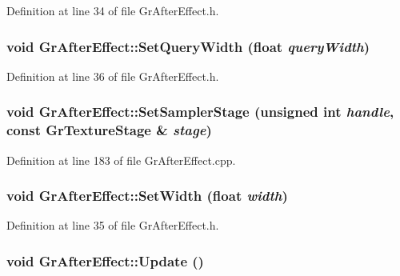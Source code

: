 Definition at line 34 of file GrAfterEffect.h.\hypertarget{class_gr_after_effect_b4c169cb494a24fd5c867bc7132c860b}{
\subsubsection[{SetQueryWidth}]{\setlength{\rightskip}{0pt plus 5cm}void GrAfterEffect::SetQueryWidth (float {\em queryWidth})}}
\label{class_gr_after_effect_b4c169cb494a24fd5c867bc7132c860b}




Definition at line 36 of file GrAfterEffect.h.\hypertarget{class_gr_after_effect_7c18aebb106dd993ad091cd64292d528}{
\subsubsection[{SetSamplerStage}]{\setlength{\rightskip}{0pt plus 5cm}void GrAfterEffect::SetSamplerStage (unsigned int {\em handle}, \/  const {\bf GrTextureStage} \& {\em stage})}}
\label{class_gr_after_effect_7c18aebb106dd993ad091cd64292d528}




Definition at line 183 of file GrAfterEffect.cpp.\hypertarget{class_gr_after_effect_e692a8aa9358c8228aed2f0c69dedb8c}{
\subsubsection[{SetWidth}]{\setlength{\rightskip}{0pt plus 5cm}void GrAfterEffect::SetWidth (float {\em width})}}
\label{class_gr_after_effect_e692a8aa9358c8228aed2f0c69dedb8c}




Definition at line 35 of file GrAfterEffect.h.\hypertarget{class_gr_after_effect_63aea2d5172f926dc628ff07f90edec6}{
\subsubsection[{Update}]{\setlength{\rightskip}{0pt plus 5cm}void GrAfterEffect::Update ()}}
\label{class_gr_after_effect_63aea2d5172f926dc628ff07f90edec6}




